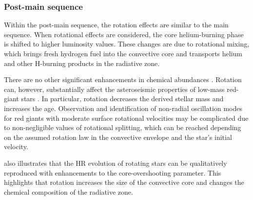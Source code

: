 \subsubsection{Post-main sequence}
Within the post-main sequence, the rotation effects are similar to the main sequence.
When rotational effects are considered, the core helium-burning phase is shifted to higher luminosity values. 
These changes are due to rotational mixing, which brings fresh hydrogen fuel into the convective core and transports helium and other H-burning products in the radiative zone.

There are no other significant enhancements in chemical abundances \citep[See Table 2. in][]{lagarde_thermohaline_2012}.
Rotation can, however, substantially affect the asteroseismic properties of low-mass red-giant stars
\citet{lagarde_thermohaline_2012, eggenberger_effects_2010}.
In particular, rotation decreases the derived stellar mass and increases the age.
Observation and identification of non-radial oscillation modes for red giants with moderate surface rotational velocities may be complicated due to non-negligible values of rotational splitting, which can be reached depending on the assumed rotation law in the convective envelope and the star's initial velocity.

\citep{eggenberger_effects_2010, lagarde_thermohaline_2012} also illustrates that the HR evolution of rotating stars can be qualitatively reproduced with enhancements to the core-overshooting parameter. 
This highlights that rotation increases the size of the convective core and changes the chemical composition of the radiative zone.







